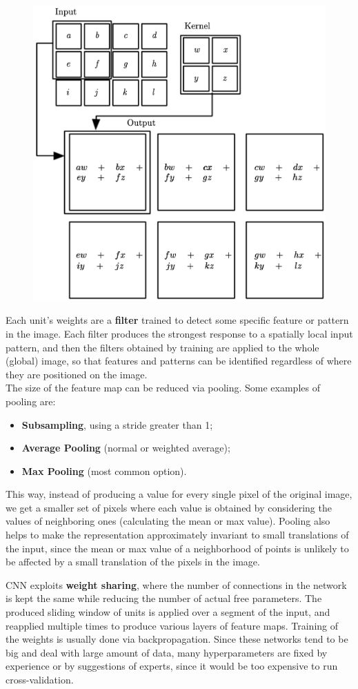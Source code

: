 \begin{figure}[h]
    \centering
    \includegraphics[width=0.5\linewidth]{img/CNN_matrix.png}
\end{figure}
Each unit's weights are a \textbf{filter} trained to detect some specific feature or pattern in the image. Each filter produces the strongest response to a spatially local input pattern, and then the filters obtained by training are applied to the whole (global) image, so that features and patterns can be identified regardless of where they are positioned on the image. \\
The size of the feature map can be reduced via pooling. Some examples of pooling are:
\begin{itemize}
    \item \textbf{Subsampling}, using a stride greater than 1;
    \item \textbf{Average Pooling} (normal or weighted average);
    \item \textbf{Max Pooling} (most common option).
\end{itemize}
This way, instead of producing a value for every single pixel of the original image, we get a smaller set of pixels where each value is obtained by considering the values of neighboring ones (calculating the mean or max value). Pooling also helps to make the representation approximately invariant to small translations of the input, since the mean or max value of a neighborhood of points is unlikely to be affected by a small translation of the pixels in the image.

CNN exploits \textbf{weight sharing}, where the number of connections in the network is kept the same while reducing the number of actual free parameters. The produced sliding window of units is applied over a segment of the input, and reapplied multiple times to produce various layers of feature maps. Training of the weights is usually done via backpropagation. Since these networks tend to be big and deal with large amount of data, many hyperparameters are fixed by experience or by suggestions of experts, since it would be too expensive to run cross-validation.

